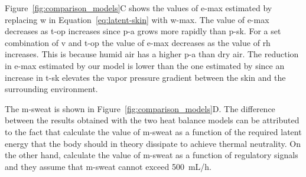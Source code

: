 Figure~\ref{fig:comparison_models}C shows the values of \ac{e-max} estimated by replacing \ac{w} in Equation~\ref{eq:latent-skin} with \ac{w-max}.
The value of \ac{e-max} decreases as \ac{t-op} increases since \ac{p-a} grows more rapidly than \ac{p-sk}.
For a set combination of \ac{v} and \ac{t-op} the value of \ac{e-max} decreases as the value of \ac{rh} increases.
This is because humid air has a higher \ac{p-a} than dry air.
The reduction in \ac{e-max} estimated by our model is lower than the one estimated by  since an increase in \ac{t-sk} elevates the vapor pressure gradient between the skin and the surrounding environment.

The \acf{m-sweat} is shown in Figure~\ref{fig:comparison_models}D\@.
The difference between the results obtained with the two heat balance models can be attributed to the fact that \citeauthor{Jay2015} calculate the value of \ac{m-sweat} as a function of the required latent energy that the body should in theory dissipate to achieve thermal neutrality.
On the other hand, \citeauthor{GaggeSET} calculate the value of \ac{m-sweat} as a function of regulatory signals and they assume that \ac{m-sweat} cannot exceed 500~mL/h.

